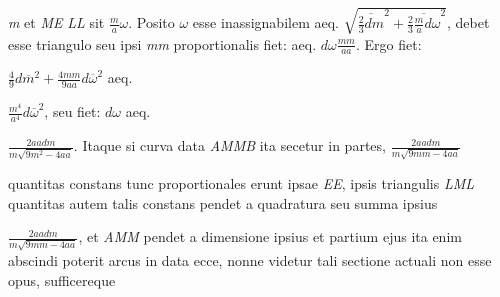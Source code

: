\textit{m} et \textit{ME} 
\textit{LL} sit $\displaystyle\frac{m}{a}\omega$. Posito $\omega$ esse inassignabilem 
aeq. $\sqrt{\overline{\displaystyle\frac{2}{3}dm}^2+\overline{\displaystyle\frac{2}{3}\displaystyle\frac{m}{a}d\omega}^2}$, 
debet esse triangulo seu ipsi \textit{mm} proportionalis fiet: 
aeq. $d\omega \displaystyle\frac{mm}{aa}$. 
Ergo fiet: \rule[-5mm]{0pt}{11mm}$\displaystyle\frac{4}{9}d\overline{m}^2+\displaystyle\frac{4mm}{9aa}d\overline{\omega}^2$ aeq. \rule[-5mm]{0pt}{11mm}$\displaystyle\frac{m^4}{a^4}d\overline{\omega}^2$, seu fiet: $d\omega$ aeq. \rule[-5mm]{0pt}{11mm}$\displaystyle\frac{2aadm}{m\sqrt{9m^2-4aa}}$. 
\pend
\pstart
Itaque si curva data \textit{AMMB} ita secetur in partes, 
$\displaystyle\frac{2aadm}{m\sqrt{9mm-4aa}}$\rule[-5mm]{0pt}{11mm} quantitas constans\bracks{,} tunc proportionales erunt ipsae \textit{EE}, ipsis triangulis \textit{LML}\bracks{,} 
quantitas autem talis constans pendet a quadratura seu summa ipsius \rule[-5mm]{0pt}{11mm}$\displaystyle\frac{2aadm}{m\sqrt{9mm-4aa}}$, et 
\textit{AMM} pendet a dimensione ipsius et partium ejus\bracks{,} ita enim abscindi poterit arcus in data 
ecce, 
%
nonne videtur tali sectione actuali non esse opus, sufficereque 
